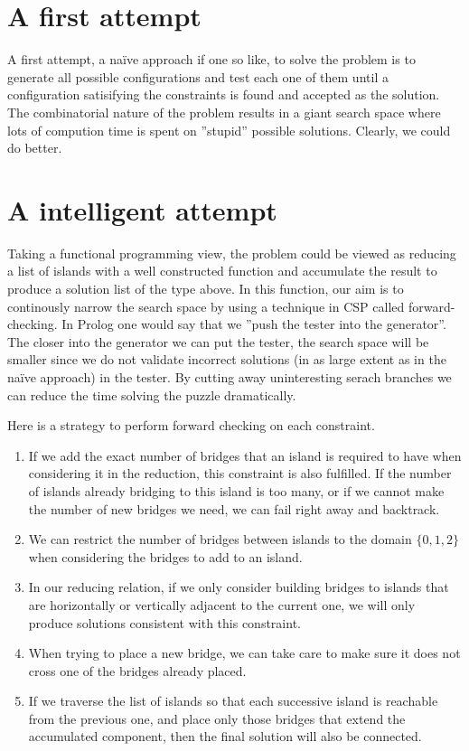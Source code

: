 \documentclass[a4paper,12pt]{article}
\begin{document}
\section*{A first attempt}
A first attempt, a naïve approach if one so like, to solve the problem is to generate all possible configurations and test each one of them until a configuration satisifying the constraints is found and accepted as the solution. The combinatorial nature of the problem results in a giant search space where lots of compution time is spent on ''stupid'' possible solutions. Clearly, we could do better.

\section*{A intelligent attempt}
Taking a functional programming view, the problem could be viewed as reducing a list of islands with a well constructed function and accumulate the result to produce a solution list of the type above. In this function, our aim is to continously narrow the search space by using a technique in CSP called forward-checking. In Prolog one would say that we ''push the tester into the generator''. The closer into the generator we can put the tester, the search space will be smaller since we do not validate incorrect solutions (in as large extent as in the naïve approach) in the tester. By cutting away uninteresting serach branches we can reduce the time solving the puzzle dramatically.

Here is a strategy to perform forward checking on each constraint.
\begin{enumerate}
    \item If we add the exact number of bridges that an island is required to have when considering it in the reduction, this constraint is also fulfilled. If the number of islands already bridging to this island is too many, or if we cannot make the number of new bridges we need, we can fail right away and backtrack.
    \item We can restrict the number of bridges between islands to the domain $\{ 0, 1, 2 \}$ when considering the bridges to add to an island.
    \item In our reducing relation, if we only consider building bridges to islands that are horizontally or vertically adjacent to the current one, we will only produce solutions consistent with this constraint.
    \item When trying to place a new bridge, we can take care to make sure it does not cross one of the bridges already placed.
    \item If we traverse the list of islands so that each successive island is reachable from the previous one, and place only those bridges that extend the accumulated component, then the final solution will also be connected.
\end{enumerate}
\end{document}
